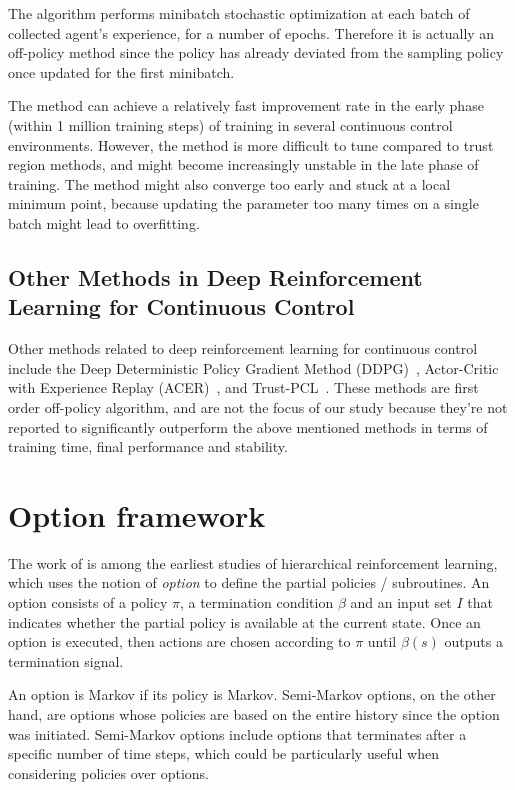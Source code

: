 The algorithm performs minibatch stochastic optimization at each batch of collected agent's experience, for a number of epochs. Therefore it is actually an off-policy method since the policy has already deviated from the sampling policy once updated for the first minibatch.

The method can achieve a relatively fast improvement rate in the early phase (within 1 million training steps) of training in several continuous control environments. However, the method is more difficult to tune compared to trust region methods, and might become increasingly unstable in the late phase of training. The method might also converge too early and stuck at a local minimum point, because updating the parameter too many times on a single batch might lead to overfitting.

\subsection{Other Methods in Deep Reinforcement Learning for Continuous Control}
Other methods related to deep reinforcement learning for continuous control include the Deep Deterministic Policy Gradient Method (DDPG)~\cite{lillicrap2015continuous}, Actor-Critic with Experience Replay (ACER)~\cite{wang2016sample}, and Trust-PCL~\cite{nachum2017trust}. These methods are first order off-policy algorithm, and are not the focus of our study because they're not reported to significantly outperform the above mentioned methods in terms of training time, final performance and stability.

\section{Option framework}
The work of \cite{sutton1999between} is among the earliest studies of hierarchical reinforcement learning, which uses the notion of \textit{option} to define the partial policies / subroutines. An option consists of a policy $\pi$, a termination condition $\beta$ and an input set $I$ that indicates whether the partial policy is available at the current state. Once an option is executed, then actions are chosen according to \(\pi\) until \(\beta(s)\) outputs a termination signal. 

An option is Markov if its policy is Markov. Semi-Markov options, on the other hand, are options whose policies are based on the entire history since the option was initiated. Semi-Markov options include options that terminates after a specific number of time steps, which could be particularly useful when considering policies over options.

